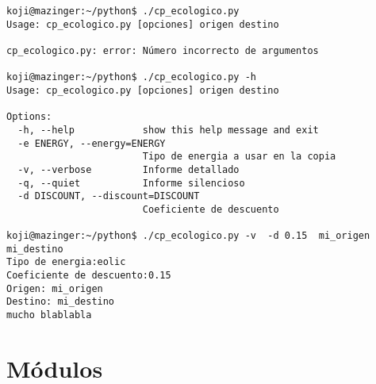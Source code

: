 \documentclass[ucs]{beamer}
\begin{document}
\begin{frame}[fragile]
  \begin{tiny}
  \begin{verbatim}
koji@mazinger:~/python$ ./cp_ecologico.py 
Usage: cp_ecologico.py [opciones] origen destino

cp_ecologico.py: error: Número incorrecto de argumentos

koji@mazinger:~/python$ ./cp_ecologico.py -h
Usage: cp_ecologico.py [opciones] origen destino

Options:
  -h, --help            show this help message and exit
  -e ENERGY, --energy=ENERGY
                        Tipo de energia a usar en la copia
  -v, --verbose         Informe detallado
  -q, --quiet           Informe silencioso
  -d DISCOUNT, --discount=DISCOUNT
                        Coeficiente de descuento

koji@mazinger:~/python$ ./cp_ecologico.py -v  -d 0.15  mi_origen  mi_destino
Tipo de energia:eolic
Coeficiente de descuento:0.15
Origen: mi_origen
Destino: mi_destino
mucho blablabla 
  \end{verbatim}
  \end{tiny}

\end{frame}



%
%
%
%
%
%



\section{Módulos}
\end{document}
